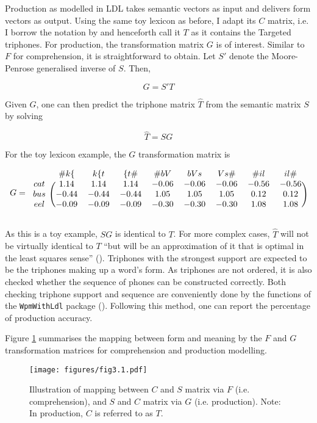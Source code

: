 Production as modelled in LDL takes semantic vectors as input and delivers form vectors as output. Using the same toy lexicon as before, I adapt its $C$ matrix, i.e. I borrow the notation by \citet{Baayen2019} and henceforth call it $T$ as it contains the Targeted triphones. For production, the transformation matrix $G$ is of interest. Similar to $F$ for comprehension, it is straightforward to obtain. Let $S'$ denote the Moore-Penrose generalised inverse of $S$. Then,

\begin{equation}
\label{eq:GST}
    G=S'T
\end{equation}

Given $G$, one can then predict the triphone matrix $\hat{T}$ from the semantic matrix $S$ by solving 

\begin{equation}
\label{eq:TSG}
    \hat{T}=SG
\end{equation}

For the toy lexicon example, the $G$ transformation matrix is 

\begin{equation}
\label{eq:Gmat}
  G = 
    \begin{blockarray}{ccccccccc}
        & {\#k\{} & {k\{t} & {\{t\#} & {\#bV} & {bVs} & {Vs\#} & {\#il} & {il\#} \\
      \begin{block}{c(cccccccc)}
        cat & 1.14 & 1.14 & 1.14 & -0.06 & -0.06 & -0.06 & -0.56 & -0.56 \\
        bus & -0.44 & -0.44 & -0.44 & 1.05 & 1.05 & 1.05 & 0.12 & 0.12 \\
        eel & -0.09 & -0.09 & -0.09 & -0.30 & -0.30 & -0.30 & 1.08 & 1.08 \\
      \end{block}
    \end{blockarray}
\end{equation}

As this is a toy example, $SG$ is identical to $T$. For more complex cases, $\hat{T}$ will not be virtually identical to $T$ “but will be an approximation of it that is optimal in the least squares sense” (\cite[21]{Baayen2019}). Triphones with the strongest support are expected to be the triphones making up a word’s form. As triphones are not ordered, it is also checked whether the sequence of phones can be constructed correctly. Both checking triphone support and sequence are conveniently done by the functions of the \texttt{WpmWithLdl} package (\cite{Baayen2019wpm}). Following this method, one can report the percentage of production accuracy.
	
Figure \ref{fig:3_1} summarises the mapping between form and meaning by the $F$ and $G$ transformation matrices for comprehension and production modelling.

\begin{figure}
    \centering
    \texttt{[image: figures/fig3.1.pdf]}
    \caption{Illustration of mapping between $C$ and $S$ matrix via $F$ (i.e. comprehension), and $S$ and $C$ matrix via $G$ (i.e. production). Note: In production, $C$ is referred to as $T$.}
    \label{fig:3_1}
\end{figure}
